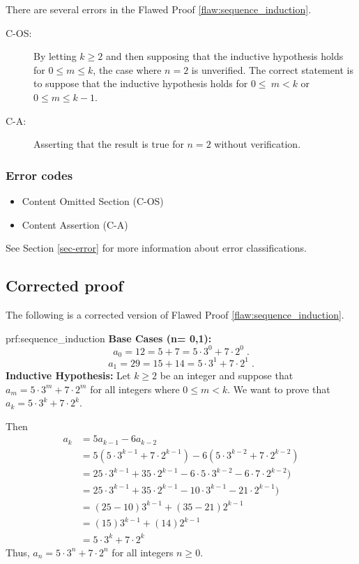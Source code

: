 
There are several errors
 in the Flawed Proof \ref{flaw:sequence_induction}. %

 
 \begin{description}
 	\item[C-OS:] By letting $k \geq 2$ and then supposing that the inductive hypothesis holds for $0 \leq m \leq k$, the case where $n=2$ is unverified. The correct statement is to suppose that the inductive hypothesis holds for $0\leq~m < k$ or $0 \leq m \leq k-1$.
 	\item [C-A:] Asserting that the result is true for $n=2$ without verification.
 \end{description}

 
\subsubsection{Error codes}
\begin{itemize}
	\item 	Content Omitted Section (C-OS)
	\item   Content Assertion (C-A)
\end{itemize}
See Section \ref{sec-error} for more information about error classifications.

\clearpage
\subsection{Corrected proof}

The following is a corrected version of Flawed Proof \ref{flaw:sequence_induction}. %

\begin{prf}{prf:sequence_induction} %
\textbf{Base Cases (n= 0,1):} 
$$a_0 = 12 = 5 + 7 = 5 \cdot 3^0 + 7\cdot 2^0\;.$$
$$a_1 = 29 = 15 + 14 = 5 \cdot 3^1 + 7\cdot 2^1\;.$$
\textbf{Inductive Hypothesis:} Let $k \geq 2$ be an integer and suppose that 
$a_m = 5\cdot3^m + 7\cdot 2^m$ for all integers where $0 \leq m < k.$ We want to prove that $a_k = 5\cdot3^k + 7\cdot 2^k$. 

Then \begin{align*}
    a_k &= 5a_{k-1} - 6a_{k-2} \\
    &= 5(5\cdot3^{k-1} + 7\cdot 2^{k-1}) - 6(5\cdot3^{k-2} + 7\cdot 2^{k-2}) \\
    &= 25\cdot3^{k-1} + 35\cdot 2^{k-1} - 6\cdot 5\cdot3^{k-2} - 6\cdot 7\cdot 2^{k-2}) \\
    &= 25\cdot3^{k-1} + 35\cdot 2^{k-1} - 10\cdot3^{k-1} - 21\cdot 2^{k-1}) \\
    &=(25 - 10)3^{k-1} + (35-21) 2^{k-1} \\
    &= (15)3^{k-1} + (14) 2^{k-1} \\
    &= 5\cdot3^k + 7\cdot 2^k
\end{align*}
Thus, 
$a_n = 5\cdot3^n + 7\cdot 2^n$ for all integers $n \geq 0$.
\end{prf}